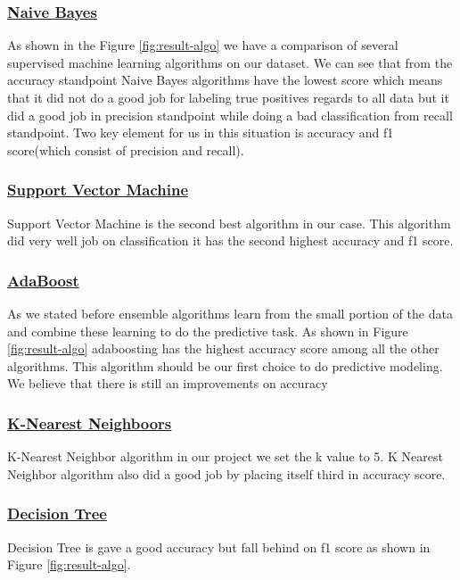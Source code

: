 \documentclass[sigconf]{acmart}
\begin{document}
\subsubsection{\textbf{\underline{Naive Bayes}}} 
As shown in the Figure \ref{fig:result-algo} we have a comparison of several supervised machine learning algorithms on our dataset. We can see that from the accuracy standpoint Naive Bayes algorithms have the lowest score which means that it did not do a good job for labeling true positives regards to all data but it did a good job in precision standpoint while doing a bad classification from recall standpoint. Two key element for us in this situation is accuracy and f1 score(which consist of precision and recall). 
\subsubsection{\textbf{\underline{Support Vector Machine}}}
Support Vector Machine is the second best algorithm in our case. This algorithm did very well job on classification it has the second highest accuracy and f1 score. 
\subsubsection{\textbf{\underline{AdaBoost}}}
As we stated before ensemble algorithms learn from the small portion of the data and combine these learning to do the predictive task. As shown in Figure \ref{fig:result-algo} adaboosting has the highest accuracy score among all the other algorithms. This algorithm should be our first choice to do predictive modeling. We believe that there is still an improvements on accuracy 
\subsubsection{\textbf{\underline{K-Nearest Neighboors}}}
K-Nearest Neighbor algorithm in our project we set the k value to 5. K Nearest Neighbor algorithm also did a good job by placing itself third in accuracy score. 

\subsubsection{\textbf{\underline{Decision Tree}}} 
Decision Tree is gave a good accuracy but fall behind on f1 score as shown in Figure \ref{fig:result-algo}.
\end{document}
